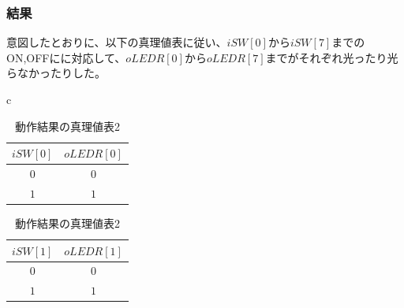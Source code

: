 \documentclass[a4paper]{jarticle}
\begin{document}
\subsubsection{結果}
意図したとおりに、以下の真理値表に従い、$iSW[0]$から$iSW[7]$までのON,OFFにに対応して、$oLEDR[0]$から$oLEDR[7]$までがそれぞれ光ったり光らなかったりした。
\begin{table}[!h]
	\begin{center}
		\begin{tabular}{c}
			\begin{minipage}{0.5\hsize}
				\begin{center}
					\caption{動作結果の真理値表1}
					\label{Work1TruthTable1}
					\begin{tabular}{|c|c|}
						\hline
						$iSW[0]$	&$oLEDR[0]$\\	\hline\hline
						$0$		&$0$\\		\hline
						$1$		&$1$\\		\hline
					\end{tabular}
				\end{center}
			\end{minipage}
			\begin{minipage}{0.5\hsize}
				\begin{center}
					\caption{動作結果の真理値表2}
					\label{Work1TruthTable2}
					\begin{tabular}{|c|c|}
						\hline
						$iSW[1]$	&$oLEDR[1]$\\	\hline\hline
						$0$		&$0$\\		\hline
						$1$		&$1$\\		\hline
					\end{tabular}
				\end{center}
			\end{minipage}
		\end{tabular}
	\end{center}
\end{table}
\end{document}
